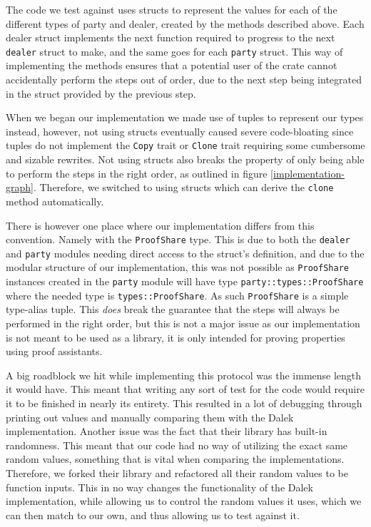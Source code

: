 \documentclass{article}
\begin{document}
The code we test against uses structs to represent the values for each 
of the different types of party and dealer, created by the methods 
described above. Each dealer struct implements the next function 
required to progress to the next \texttt{dealer} struct to make, and 
the same goes for each \texttt{party} struct. This way of implementing 
the methods ensures that a potential user of the crate cannot 
accidentally perform the steps out of order, due to the next step being 
integrated in the struct provided by the previous step.

When we began our implementation we made use of tuples to represent our
types instead, however, not using structs eventually caused severe 
code-bloating since tuples do not implement the \texttt{Copy} trait or 
\texttt{Clone} trait requiring some cumbersome and sizable rewrites. 
Not using structs also breaks the property of only being able to perform 
the steps in the right order, as outlined in figure \ref{implementation-graph}. 
Therefore, we switched to using structs which can derive the \texttt{clone} 
method automatically. 

There is however one place where our implementation differs from this 
convention. Namely with the \texttt{ProofShare} type. This is due to 
both the \texttt{dealer} and \texttt{party} modules needing direct access to the struct's 
definition, and due to the modular structure of our implementation, this 
was not possible as \texttt{ProofShare} instances created in the \texttt{party} 
module will have type \texttt{party::types::ProofShare} where the needed 
type is \texttt{types::ProofShare}. As such \texttt{ProofShare} is a 
simple type-alias tuple. This \textit{does} break the guarantee that the 
steps will always be performed in the right order, but this is not a major 
issue as our implementation is not meant to be used as a library, it is 
only intended for proving properties using proof assistants.

A big roadblock we hit while implementing this protocol was the
immense length it would have. This meant that writing any sort of test
for the code would require it to be finished in nearly its entirety.
This resulted in a lot of debugging through printing out values and manually comparing
them with the Dalek implementation. Another issue was the fact that
their library has built-in randomness. This meant that our code had
no way of utilizing the exact same random values, something that is
vital when comparing the implementations. Therefore, we forked their library and refactored
all their random values to be function inputs. This in no way
changes the functionality of the Dalek implementation, while allowing us to control the random values it uses, which we can then
match to our own, and thus allowing us to test against it.
\end{document}
